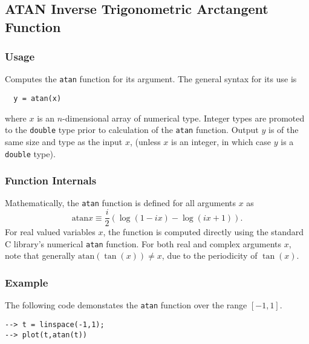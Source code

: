 %
%
%
\subsection{ATAN Inverse Trigonometric Arctangent Function}
\subsubsection{Usage}
Computes the \verb|atan| function for its argument.  The general
syntax for its use is
\begin{verbatim}
  y = atan(x)
\end{verbatim}
where $x$ is an $n$-dimensional array of numerical type.
Integer types are promoted to the \verb|double| type prior to
calculation of the \verb|atan| function.  Output $y$ is of the
same size and type as the input $x$, (unless $x$ is an
integer, in which case $y$ is a \verb|double| type).  
\subsubsection{Function Internals}
Mathematically, the \verb|atan| function is defined for all 
arguments $x$ as
\[ 
   \mathrm{atan} x \equiv \frac{i}{2}\left(\log(1-i x) - \log(i x + 1)\right).
\]
For real valued variables $x$, the function is computed directly using 
the standard C library's numerical \verb|atan| function. For both 
real and complex arguments $x$, note that generally
$\mathrm{atan}(\tan(x)) \neq x$, due to the periodicity of $\tan(x)$.
\subsubsection{Example}
The following code demonstates the \verb|atan| function over the range 
$[-1,1]$.
\begin{verbatim}
--> t = linspace(-1,1);
--> plot(t,atan(t))
\end{verbatim}

